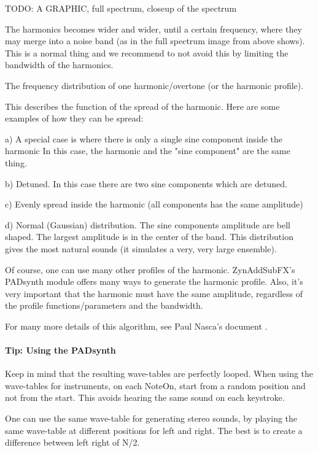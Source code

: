       TODO:  A GRAPHIC, full spectrum, closeup of the spectrum

   The harmonics becomes wider and wider, until a certain frequency, where
   they may merge into a noise band (as in the full spectrum image from above
   shows). This is a normal thing and we recommend to not avoid this by
   limiting the bandwidth of the harmonics.

   The frequency distribution of one harmonic/overtone (or the harmonic
   profile).

   This describes the function of the spread of the harmonic.
   Here are some examples of how they can be spread:

   a) A special case is where there is only a single sine component inside the
   harmonic In this case, the harmonic and the "sine component" are the same
   thing.

   b) Detuned. In this case there are two sine components which are detuned.

   c) Evenly spread inside the harmonic (all components has the same amplitude)

   d) Normal (Gaussian) distribution. The sine components amplitude are bell
   shaped. The largest amplitude is in the center of the band. This distribution
   gives the most natural sounds (it simulates a very, very large ensemble).

   Of course, one can use many other profiles of the harmonic. ZynAddSubFX's
   PADsynth module offers many ways to generate the harmonic profile.  Also, it's
   very important that the harmonic must have the same amplitude, regardless of
   the profile functions/parameters and the bandwidth.

   For many more details of this algorithm, see Paul Nasca's document
   \cite{zyndoc}.

\paragraph{Tip: Using the PADsynth}
\label{tips_using_the_padsynth}

   Keep in mind that the resulting wave-tables are perfectly looped.
   When using the wave-tables for instruments, on each NoteOn, start from a
   random position and not from the start. This avoids hearing the same sound
   on each keystroke.

   One can use the same wave-table for generating stereo sounds, by playing
   the same wave-table at different positions for left and right. The best is
   to create a difference between left right of N/2.

